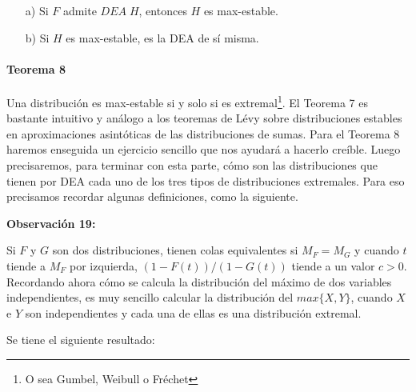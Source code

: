 \documentclass[
  oneside]{book}
\begin{document}
\begin{itemize}
  \item[a)] Si $F$ admite $DEA\;H$, entonces $H$ es max-estable.
  \item[b)] Si $H$ es max-estable, es la DEA de sí misma.
\end{itemize}

\hypertarget{teorema-8}{%
\paragraph{Teorema 8}\label{teorema-8}}

Una distribución es max-estable si y solo si es
extremal\footnote{O sea Gumbel, Weibull o Fréchet}. El Teorema 7 es
bastante intuitivo y análogo a los teoremas de Lévy sobre distribuciones
estables en aproximaciones asintóticas de las distribuciones de sumas.
Para el Teorema 8 haremos enseguida un ejercicio sencillo que nos
ayudará a hacerlo creíble. Luego precisaremos, para terminar con esta
parte, cómo son las distribuciones que tienen por DEA cada uno de los
tres tipos de distribuciones extremales. Para eso precisamos recordar
algunas definiciones, como la siguiente.

\textbf{Observación 19:}

Si \(F\) y \(G\) son dos distribuciones, tienen colas equivalentes si
\(M_F=M_G\) y cuando \(t\) tiende a \(M_F\) por izquierda,
\((1-F(t))/(1-G(t))\) tiende a un valor \(c>0\). Recordando ahora cómo
se calcula la distribución del máximo de dos variables independientes,
es muy sencillo calcular la distribución del \(max\{X,Y\}\), cuando
\(X\) e \(Y\) son independientes y cada una de ellas es una distribución
extremal.

Se tiene el siguiente resultado:
\end{document}
